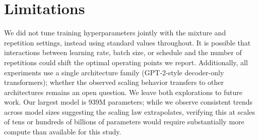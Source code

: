 \newpage
\section{Limitations}
\label{sec:limitations}
We did not tune training hyperparameters jointly with the mixture and repetition settings, instead using standard values throughout. It is possible that interactions between learning rate, batch size, or schedule and the number of repetitions could shift the optimal operating points we report.
Additionally, all experiments use a single architecture family (GPT-2-style decoder-only transformers); whether the observed scaling behavior transfers to other architectures remains an open question. We leave both explorations to future work.
Our largest model is 939M parameters; while we observe consistent trends across model sizes suggesting the scaling law extrapolates, verifying this at scales of tens or hundreds of billions of parameters would require substantially more compute than available for this study.

